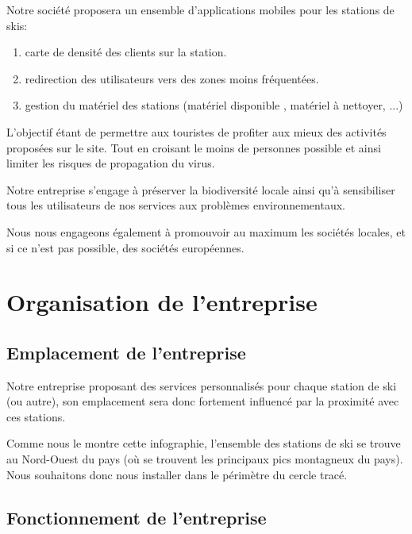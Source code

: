 {Notre société proposera un ensemble d'applications mobiles pour les stations de skis: \n
\begin{enumerate}
    \item carte de densité des clients sur la station. 
    \item redirection des utilisateurs vers des zones moins fréquentées.
    \item gestion du matériel des stations (matériel disponible , matériel à nettoyer, ...)
\end{enumerate}
  
L'objectif étant de permettre aux touristes de profiter aux mieux des activités proposées sur le site. Tout en croisant le moins de personnes possible et ainsi limiter les risques de propagation du virus. \n   
  
Notre entreprise s'engage à préserver la biodiversité locale ainsi qu'à sensibiliser tous les utilisateurs de nos services aux problèmes environnementaux. \n

Nous nous engageons également à promouvoir au maximum les sociétés locales, et si ce n'est pas possible, des sociétés européennes. 







\chapter{Organisation de l'entreprise}



\section{Emplacement de l'entreprise}

Notre entreprise proposant des services personnalisés pour chaque station de ski (ou autre), son emplacement sera donc fortement influencé par la proximité avec ces stations.\n 


Comme nous le montre cette infographie, l'ensemble des stations de ski se trouve au Nord-Ouest du pays (où se trouvent les principaux pics montagneux du pays). Nous souhaitons donc nous installer dans le périmètre du cercle tracé. \\




\section{Fonctionnement de l'entreprise}

}
